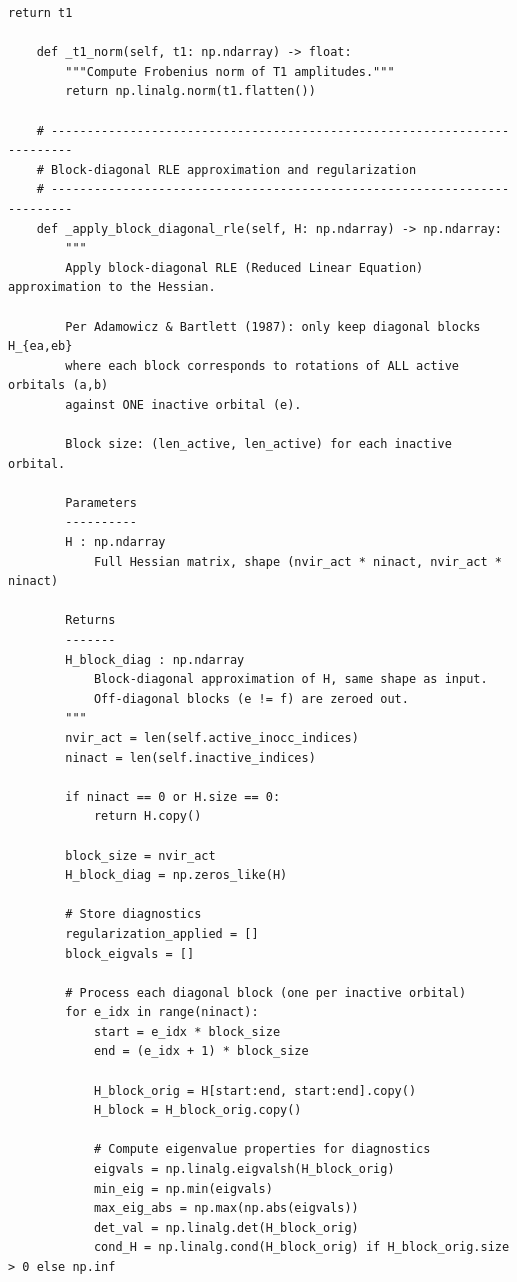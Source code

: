 \begin{lstlisting}[style=python, caption={...}, label=lst:full_code]
        return t1

    def _t1_norm(self, t1: np.ndarray) -> float:
        """Compute Frobenius norm of T1 amplitudes."""
        return np.linalg.norm(t1.flatten())

    # -------------------------------------------------------------------------
    # Block-diagonal RLE approximation and regularization
    # -------------------------------------------------------------------------
    def _apply_block_diagonal_rle(self, H: np.ndarray) -> np.ndarray:
        """
        Apply block-diagonal RLE (Reduced Linear Equation) approximation to the Hessian.
        
        Per Adamowicz & Bartlett (1987): only keep diagonal blocks H_{ea,eb}
        where each block corresponds to rotations of ALL active orbitals (a,b) 
        against ONE inactive orbital (e).
        
        Block size: (len_active, len_active) for each inactive orbital.
        
        Parameters
        ----------
        H : np.ndarray
            Full Hessian matrix, shape (nvir_act * ninact, nvir_act * ninact)
        
        Returns
        -------
        H_block_diag : np.ndarray
            Block-diagonal approximation of H, same shape as input.
            Off-diagonal blocks (e != f) are zeroed out.
        """
        nvir_act = len(self.active_inocc_indices)
        ninact = len(self.inactive_indices)
        
        if ninact == 0 or H.size == 0:
            return H.copy()
        
        block_size = nvir_act
        H_block_diag = np.zeros_like(H)
        
        # Store diagnostics
        regularization_applied = []
        block_eigvals = []
        
        # Process each diagonal block (one per inactive orbital)
        for e_idx in range(ninact):
            start = e_idx * block_size
            end = (e_idx + 1) * block_size
            
            H_block_orig = H[start:end, start:end].copy()
            H_block = H_block_orig.copy()
            
            # Compute eigenvalue properties for diagnostics
            eigvals = np.linalg.eigvalsh(H_block_orig)
            min_eig = np.min(eigvals)
            max_eig_abs = np.max(np.abs(eigvals))
            det_val = np.linalg.det(H_block_orig)
            cond_H = np.linalg.cond(H_block_orig) if H_block_orig.size > 0 else np.inf
            

\end{lstlisting}
